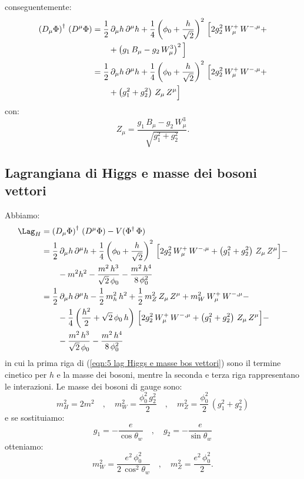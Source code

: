 conseguentemente:
\begin{align}
    \left(D_\mu\Phi\right)^\dagger\, \left(D^\mu\Phi\right) &= \frac{1}{2}\, \partial_\mu h\, \partial^\mu h + \frac{1}{4}\left(\phi_0 + \frac{h}{\sqrt{2}}\right)^2\, \Big[ 2g_2^2\, W_\mu^+\, W^{-,\mu} + \notag \\
    &\qquad + \left( g_1\, B_\mu - g_2\, W_\mu^3 \right)^2 \Big] \\
    &= \frac{1}{2}\, \partial_\mu h\, \partial^\mu h + \frac{1}{4}\left(\phi_0 + \frac{h}{\sqrt{2}}\right)^2\, \Big[ 2g_2^2\, W_\mu^+\, W^{-,\mu} + \notag \\
    &\qquad + \left( g_1^2 + g_2^2 \right)\, Z_\mu\, Z^\mu \Big]
\end{align}
con:
\begin{equation}
    Z_\mu = \frac{g_1\, B_\mu - g_2\, W_\mu^3}{\sqrt{g_1^2 + g_2^2}}.
\end{equation}


\subsection{Lagrangiana di Higgs e masse dei bosoni vettori}

Abbiamo:
\begin{align}
    \Lag_H &= \left(D_\mu\Phi\right)^\dagger\, \left(D^\mu\Phi\right) - V(\Phi^\dagger\, \Phi) \\
    &= \frac{1}{2}\, \partial_\mu h\, \partial^\mu h + \frac{1}{4}\left(\phi_0 + \frac{h}{\sqrt{2}}\right)^2\, \Big[ 2g_2^2\, W_\mu^+\, W^{-,\mu} + \left( g_1^2 + g_2^2 \right)\, Z_\mu\, Z^\mu \Big] - \notag \\
    &\qquad - m^2 h^2 - \frac{m^2\, h^3}{\sqrt{2}\, \phi_0} - \frac{m^2\, h^4}{8\, \phi_0^2} \\
    &= \frac{1}{2}\, \partial_\mu h\, \partial^\mu h - \frac{1}{2}\, m_h^2\, h^2 + \frac{1}{2}\, m_Z^2\, Z_\mu\, Z^\mu + m_W^2\, W_\mu^+\, W^{-,\mu} - \notag \\
    &\qquad - \frac{1}{4}\left(\frac{h^2}{2} + \sqrt{2}\, \phi_0\, h\right)\, \Big[ 2g_2^2\, W_\mu^+\, W^{-,\mu} + \left( g_1^2 + g_2^2 \right)\, Z_\mu\, Z^\mu \Big] - \notag \\
    &\qquad - \frac{m^2\, h^3}{\sqrt{2}\, \phi_0} - \frac{m^2\, h^4}{8\, \phi_0^2} \label{eqn:5 lag Higgs e masse bos vettori}
\end{align}
in cui la prima riga di (\ref{eqn:5 lag Higgs e masse bos vettori}) sono il termine cinetico per $h$ e la masse dei bosoni, mentre la seconda e terza riga rappresentano le interazioni. Le masse dei bosoni di gauge sono:
\begin{equation}
    m_H^2 = 2m^2 \quad , \quad m_W^2 = \frac{\phi_0^2\, g_2^2}{2} \quad , \quad m_Z^2 = \frac{\phi_0^2}{2}\, \left(g_1^2 + g_2^2\right)
\end{equation}
e se sostituiamo:
\begin{equation}
    g_1 = -\frac{e}{\cos\theta_w} \quad , \quad g_2 = -\frac{e}{\sin\theta_w}
\end{equation}
otteniamo:
\begin{equation}
    m_W^2 = \frac{e^2\, \phi_0^2}{2\, \cos^2\theta_w} \quad , \quad m_Z^2 = \frac{e^2\, \phi_0^2}{2}.
\end{equation}


